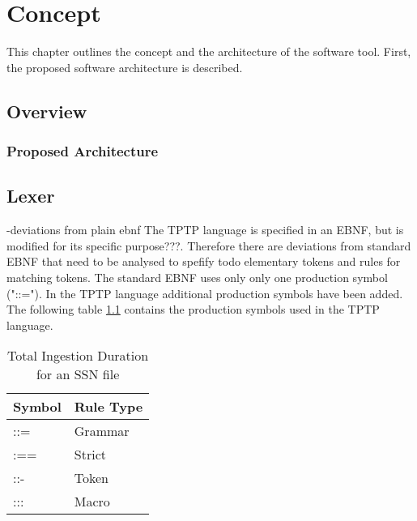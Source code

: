 
\chapter{Concept}\label{cha:Concept}
This chapter outlines the concept and the architecture of the software tool. First, the proposed software architecture is described.



\section{Overview}\label{sec:ConceptOverview}

\subsection{Proposed Architecture}\label{sec:ConceptProposedArchitecture}

\section{Lexer}
-deviations from plain ebnf
The \ac{TPTP} language is specified in an \ac{EBNF}, but is modified for its specific purpose???.
Therefore there are deviations from standard \ac{EBNF} that need to be analysed to spefify todo elementary tokens and rules for matching tokens.
The standard \ac{EBNF} uses only only one production symbol ("::="). In the \ac{TPTP} language
additional production symbols have been added. The following table \ref{tbl:ConceptTPTPProductionSymbols} contains the production symbols used in the \ac{TPTP} language.



\begin{table}[H]
\centering
\renewcommand{\arraystretch}{1.1}
\caption{Total Ingestion Duration for an \ac{SSN} file}
\begin{tabular}{ll}
\textbf{Symbol} & \textbf{Rule Type}\\\hline
::= & Grammar\\
:== & Strict\\
::- & Token\\
::: & Macro\\
\end{tabular}
\label{tbl:ConceptTPTPProductionSymbols}
\end{table}

\cite{VS06}

